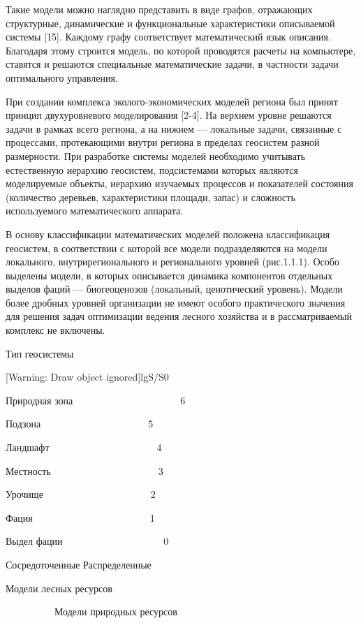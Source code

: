\documentclass{report}
\begin{document}
Такие модели можно наглядно представить в виде графов, отражающих структурные, динамические и функциональные
характеристики описываемой системы [15]. Каждому графу соответствует математический язык описания. Благодаря этому
строится модель, по которой проводятся расчеты на компьютере, ставятся и решаются специальные математические задачи, в
частности задачи оптимального управления.

При создании комплекса эколого-экономических моделей региона был принят принцип двухуровневого мо\-делирования [2-4]. На
верхнем уровне решаются задачи в рамках всего региона, а на нижнем — локальные задачи, связанные с процессами,
протекающими внутри региона в пределах геосистем разной размерности. При разработке системы моделей необходимо
учитывать есте\-ственную иерархию геосистем, подсистемами которых являются моделируемые объекты, иерархию изучаемых
процессов и пока\-зателей состояния (количество деревьев, характеристики площа\-ди, запас) и сложность используемого
математического аппарата.

В основу классификации математических моделей положена классификация геосистем, в соответствии с которой все модели
подразделяются на модели локального, внутрирегионального и регионального уровней (рис.1.1.1). Особо выделены модели, в
которых описывается динамика компонентов отдельных выделов фаций — биогеоценозов (локальный, ценотический уро\-вень).
Модели более дробных уровней организации не имеют особого практического значения для решения задач оптимизации ведения
лесно\-го хозяйства и в рассматриваемый комплекс не включены.

Тип геосистемы

[Warning: Draw object ignored]lgS/S0

Природная зона\ \ \ \ \ \ \ \ \ \ \ \ \ \ \ \ \ \ \ \ \ \ 6

Подзона\ \ \ \ \ \ \ \ \ \ \ \ \ \ \ \ \ \ \ \ \ \ 5

Ландшафт\ \ \ \ \ \ \ \ \ \ \ \ \ \ \ \ \ \ \ \ \ \ 4

Местность\ \ \ \ \ \ \ \ \ \ \ \ \ \ \ \ \ \ \ \ \ \ 3

Урочище\ \ \ \ \ \ \ \ \ \ \ \ \ \ \ \ \ \ \ \ \ \ 2

Фация\ \ \ \ \ \ \ \ \ \ \ \ \ \ \ \ \ \ \ \ \ \ \ \ 1

Выдел фации  \ \ \ \ \ \ \ \ \ \ \ \ \ \ \ \ \ \ \ \ 0

 Сосредоточенные  Распределенные

 Модели лесных ресурсов

\ \ \ \ \ \ \ \ \ \   Модели природных ресурсов
\end{document}
